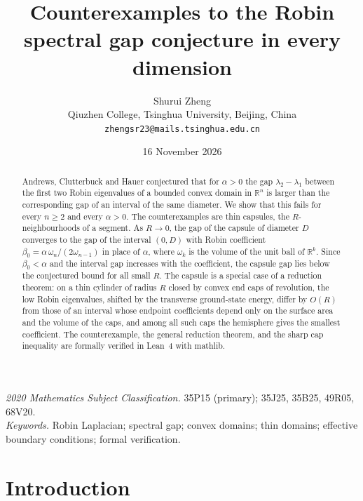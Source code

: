 \documentclass[11pt,a4paper]{article}
\title{Counterexamples to the Robin spectral gap conjecture in every dimension}
\author{Shurui Zheng\\[.6em]
  {\small Qiuzhen College, Tsinghua University, Beijing, China}\\[.3em]
  {\small \texttt{zhengsr23@mails.tsinghua.edu.cn}}}
\date{16 November 2026}
\numberwithin{equation}{section}
\theoremstyle{paperplain}
\theoremstyle{remark}
\newcommand{\R}{\mathbb{R}}
\begin{document}
\maketitle
\thispagestyle{plain}

\begin{abstract}
Andrews, Clutterbuck and Hauer conjectured that for $\alpha>0$ the gap
$\lambda_2-\lambda_1$ between the first two Robin eigenvalues of a bounded
convex domain in $\R^n$ is larger than the corresponding gap of an interval
of the same diameter. We show that this fails for every $n\ge2$ and every
$\alpha>0$. The counterexamples are thin capsules, the $R$-neighbourhoods of
a segment. As $R\to0$, the gap of the capsule of diameter $D$ converges to
the gap of the interval $(0,D)$ with Robin coefficient
$\beta_0=\alpha\,\omega_n/(2\omega_{n-1})$ in place of $\alpha$, where
$\omega_k$ is the volume of the unit ball of $\R^k$. Since $\beta_0<\alpha$
and the interval gap increases with the coefficient, the capsule gap lies
below the conjectured bound for all small $R$. The capsule is a special case
of a reduction theorem: on a thin cylinder of radius $R$ closed by convex
end caps of revolution, the low Robin eigenvalues, shifted by the transverse
ground-state energy, differ by $O(R)$ from those of an interval whose
endpoint coefficients depend only on the surface area and the volume of the
caps, and among all such caps the hemisphere gives the smallest coefficient.
The counterexample, the general reduction theorem, and the sharp cap
inequality are formally verified in Lean~4 with mathlib.
\end{abstract}

\noindent\textit{2020 Mathematics Subject Classification.} 35P15 (primary);
35J25, 35B25, 49R05, 68V20.\\
\textit{Keywords.} Robin Laplacian; spectral gap; convex domains; thin
domains; effective boundary conditions; formal verification.

\section{Introduction}\label{sec:intro}
\end{document}
